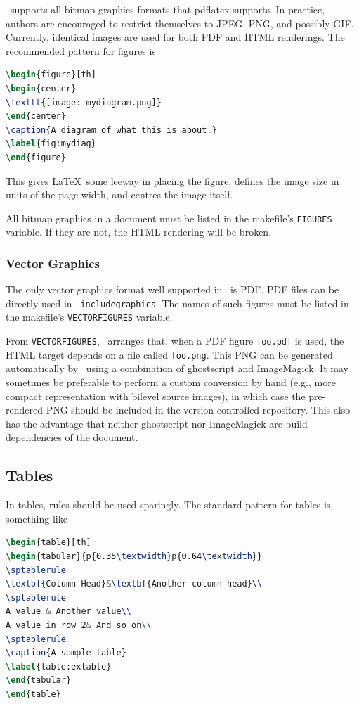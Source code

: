 \documentclass[11pt,a4paper]{ivoa}
\newcommand{\texword}[1]{\texttt{\color{texcolor} #1}}
\begin{document}
\ivoatex\ supports all bitmap graphics formats that pdflatex supports.
In practice, authors are encouraged to restrict themselves to JPEG, PNG,
and possibly GIF.  Currently, identical images are used for both PDF and
HTML renderings.  The recommended pattern for figures is
\begin{lstlisting}[language=tex]
\begin{figure}[th]
\begin{center}
\texttt{[image: mydiagram.png]}
\end{center}
\caption{A diagram of what this is about.}
\label{fig:mydiag}
\end{figure}
\end{lstlisting}
This gives \LaTeX\ some leeway in placing the figure, defines the image
size in units of the page width, and centres the image itself.

All bitmap graphics in a document must  be listed in the makefile's
\texttt{FIGURES} variable.  If they are not, the HTML rendering will be
broken.

\subsubsection{Vector Graphics}
\label{sect:vectorgraphics}

The only vector graphics format well supported in \ivoatex\ is PDF.  PDF
files can be directly used in \texword{includegraphics}.  The names of
such figures must be listed in the makefile's \texttt{VECTORFIGURES}
variable.

From \texttt{VECTORFIGURES}, \ivoatex\ arranges that, when a PDF figure
\texttt{foo.pdf} is used, the HTML target depends on a file called
\texttt{foo.png}.  This PNG can be generated automatically by
\ivoatex\ using a combination of ghostscript and ImageMagick.  It may
sometimes be preferable to perform a custom conversion by hand (e.g.,
more compact representation with bilevel source images), in which case
the pre-rendered PNG should be included in the version controlled
repository.  This also
has the advantage that neither ghostscript nor ImageMagick are build
dependencies of the document.

\subsection{Tables}

In tables, rules should be used sparingly.  The standard pattern for tables is
something like
\begin{lstlisting}[language=tex]
\begin{table}[th]
\begin{tabular}{p{0.35\textwidth}p{0.64\textwidth}}
\sptablerule
\textbf{Column Head}&\textbf{Another column head}\\
\sptablerule
A value & Another value\\
A value in row 2& And so on\\
\sptablerule
\caption{A sample table}
\label{table:extable}
\end{tabular}
\end{table}
\end{lstlisting}
\end{document}
